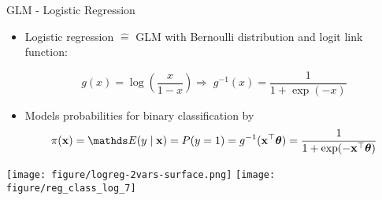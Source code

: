 \documentclass[11pt,compress,t,notes=noshow, aspectratio=169, xcolor=table]{beamer}
\begin{document}
\begin{frame}{GLM - Logistic Regression}

\begin{itemize}
    \item Logistic regression $\hat{=}$ GLM with Bernoulli distribution and logit link function: 


$$
g(x) = \log\left(\frac{x}{1 - x}\right)  
\Rightarrow \; g^{-1}(x) = \frac{1}{1+\exp(-x)}
$$





    \item Models probabilities for binary classification by
    $$\pi(\xv) = \E(y \mid \xv) = P(y = 1) = g^{-1}(\xv^\top \thetav) = \frac{1}{1 + \exp(- \xv^\top \thetav)} $$
\end{itemize}
\centering
\texttt{[image: figure/logreg-2vars-surface.png]} \qquad
\texttt{[image: figure/reg\_class\_log\_7]} 
\end{frame}
\end{document}
